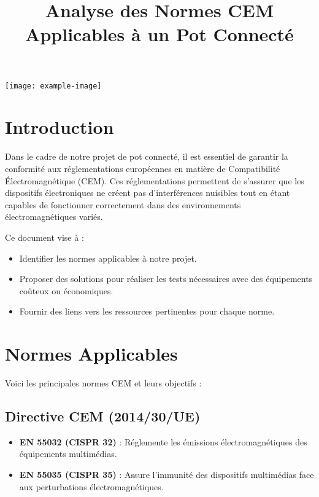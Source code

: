 \documentclass[a4paper,12pt]{article}
\title{Analyse des Normes CEM Applicables à un Pot Connecté}
\author{}
\date{}
\begin{document}
\maketitle

\begin{center}
    \texttt{[image: example-image]} %
\end{center}

\newpage

\tableofcontents
\newpage

\section*{Introduction}
Dans le cadre de notre projet de pot connecté, il est essentiel de garantir la conformité aux réglementations européennes en matière de Compatibilité Électromagnétique (CEM). Ces réglementations permettent de s'assurer que les dispositifs électroniques ne créent pas d'interférences nuisibles tout en étant capables de fonctionner correctement dans des environnements électromagnétiques variés.

Ce document vise à :
\begin{itemize}
    \item Identifier les normes applicables à notre projet.
    \item Proposer des solutions pour réaliser les tests nécessaires avec des équipements coûteux ou économiques.
    \item Fournir des liens vers les ressources pertinentes pour chaque norme.
\end{itemize}

\newpage

\section{Normes Applicables}
Voici les principales normes CEM et leurs objectifs :

\subsection{Directive CEM (2014/30/UE)}
\begin{itemize}
    \item \textbf{EN 55032 (CISPR 32)} : Réglemente les émissions électromagnétiques des équipements multimédias.
    \item \textbf{EN 55035 (CISPR 35)} : Assure l'immunité des dispositifs multimédias face aux perturbations électromagnétiques.
\end{itemize}
\end{document}
